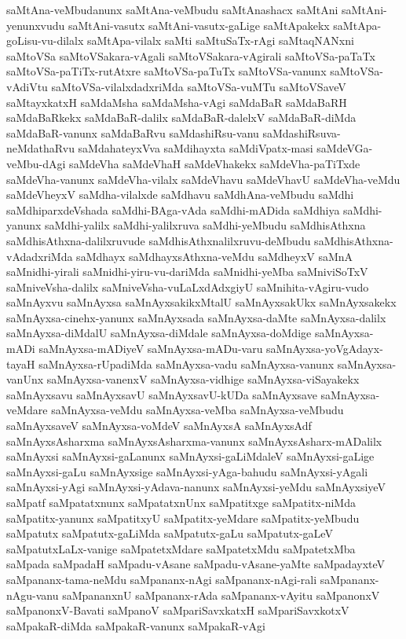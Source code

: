 {saMtAna-veMbudanunx
saMtAna-veMbudu
saMtAnashacx
saMtAni
saMtAni-yenunxvudu
saMtAni-vasutx
saMtAni-vasutx-gaLige
saMtApakekx
saMtApa-goLisu-vu-dilalx
saMtApa-vilalx
saMti
saMtuSaTx-rAgi
saMtaqNANxni
saMtoVSa
saMtoVSakara-vAgali
saMtoVSakara-vAgirali
saMtoVSa-paTaTx
saMtoVSa-paTiTx-rutAtxre
saMtoVSa-paTuTx
saMtoVSa-vanunx
saMtoVSa-vAdiVtu
saMtoVSa-vilalxdadxriMda
saMtoVSa-vuMTu
saMtoVSaveV
saMtayxkatxH
saMdaMsha
saMdaMsha-vAgi
saMdaBaR
saMdaBaRH
saMdaBaRkekx
saMdaBaR-dalilx
saMdaBaR-dalelxV
saMdaBaR-diMda
saMdaBaR-vanunx
saMdaBaRvu
saMdashiRsu-vanu
saMdashiRsuva-neMdathaRvu
saMdahateyxVva
saMdihayxta
saMdiVpatx-masi
saMdeVGa-veMbu-dAgi
saMdeVha
saMdeVhaH
saMdeVhakekx
saMdeVha-paTiTxde
saMdeVha-vanunx
saMdeVha-vilalx
saMdeVhavu
saMdeVhavU
saMdeVha-veMdu
saMdeVheyxV
saMdha-vilalxde
saMdhavu
saMdhAna-veMbudu
saMdhi
saMdhiparxdeVshada
saMdhi-BAga-vAda
saMdhi-mADida
saMdhiya
saMdhi-yanunx
saMdhi-yalilx
saMdhi-yalilxruva
saMdhi-yeMbudu
saMdhisAthxna
saMdhisAthxna-dalilxruvude
saMdhisAthxnalilxruvu-deMbudu
saMdhisAthxna-vAdadxriMda
saMdhayx
saMdhayxsAthxna-veMdu
saMdheyxV
saMnA
saMnidhi-yirali
saMnidhi-yiru-vu-dariMda
saMnidhi-yeMba
saMniviSoTxV
saMniveVsha-dalilx
saMniveVsha-vuLaLxdAdxgiyU
saMnihita-vAgiru-vudo
saMnAyxvu
saMnAyxsa
saMnAyxsakikxMtalU
saMnAyxsakUkx
saMnAyxsakekx
saMnAyxsa-cinehx-yanunx
saMnAyxsada
saMnAyxsa-daMte
saMnAyxsa-dalilx
saMnAyxsa-diMdalU
saMnAyxsa-diMdale
saMnAyxsa-doMdige
saMnAyxsa-mADi
saMnAyxsa-mADiyeV
saMnAyxsa-mADu-varu
saMnAyxsa-yoVgAdayx-tayaH
saMnAyxsa-rUpadiMda
saMnAyxsa-vadu
saMnAyxsa-vanunx
saMnAyxsa-vanUnx
saMnAyxsa-vanenxV
saMnAyxsa-vidhige
saMnAyxsa-viSayakekx
saMnAyxsavu
saMnAyxsavU
saMnAyxsavU-kUDa
saMnAyxsave
saMnAyxsa-veMdare
saMnAyxsa-veMdu
saMnAyxsa-veMba
saMnAyxsa-veMbudu
saMnAyxsaveV
saMnAyxsa-voMdeV
saMnAyxsA
saMnAyxsAdf
saMnAyxsAsharxma
saMnAyxsAsharxma-vanunx
saMnAyxsAsharx-mADalilx
saMnAyxsi
saMnAyxsi-gaLanunx
saMnAyxsi-gaLiMdaleV
saMnAyxsi-gaLige
saMnAyxsi-gaLu
saMnAyxsige
saMnAyxsi-yAga-bahudu
saMnAyxsi-yAgali
saMnAyxsi-yAgi
saMnAyxsi-yAdava-nanunx
saMnAyxsi-yeMdu
saMnAyxsiyeV
saMpatf
saMpatatxnunx
saMpatatxnUnx
saMpatitxge
saMpatitx-niMda
saMpatitx-yanunx
saMpatitxyU
saMpatitx-yeMdare
saMpatitx-yeMbudu
saMpatutx
saMpatutx-gaLiMda
saMpatutx-gaLu
saMpatutx-gaLeV
saMpatutxLaLx-vanige
saMpatetxMdare
saMpatetxMdu
saMpatetxMba
saMpada
saMpadaH
saMpadu-vAsane
saMpadu-vAsane-yaMte
saMpadayxteV
saMpananx-tama-neMdu
saMpananx-nAgi
saMpananx-nAgi-rali
saMpananx-nAgu-vanu
saMpananxnU
saMpananx-rAda
saMpananx-vAyitu
saMpanonxV
saMpanonxV-Bavati
saMpanoV
saMpariSavxkatxH
saMpariSavxkotxV
saMpakaR-diMda
saMpakaR-vanunx
saMpakaR-vAgi
}

